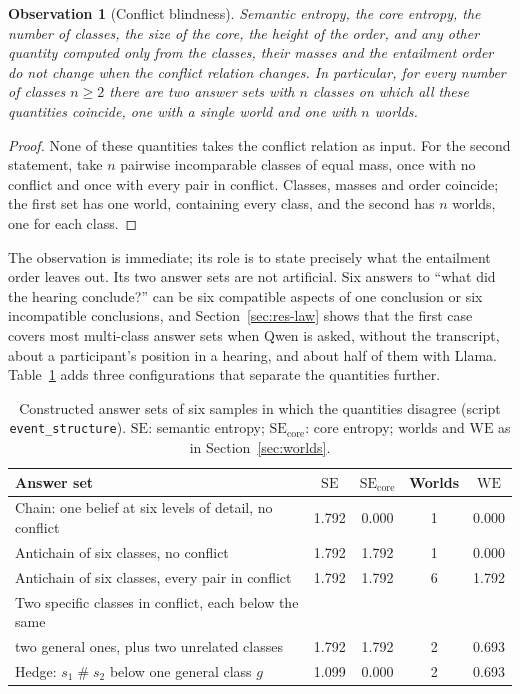 \documentclass[english]{desafiokunumi}
\newtheorem{observation}[proposition]{Observation}
\theoremstyle{definition}
\theoremstyle{remark}
\newcommand{\SE}{\mathrm{SE}}
\newcommand{\SEc}{\mathrm{SE}_{\mathrm{core}}}
\newcommand{\WE}{\mathrm{WE}}
\newcommand{\cf}{\mathrel{\#}}
\begin{document}
\begin{observation}[Conflict blindness]
\label{obs:cegueira}
Semantic entropy, the core entropy, the number of classes, the size of the
core, the height of the order, and any other quantity computed only from the
classes, their masses and the entailment order do not change when the conflict
relation changes. In particular, for every number of classes $n \ge 2$ there
are two answer sets with $n$ classes on which all these quantities coincide,
one with a single world and one with $n$ worlds.
\end{observation}

\begin{proof}
None of these quantities takes the conflict relation as input. For the second
statement, take $n$ pairwise incomparable classes of equal mass, once with no
conflict and once with every pair in conflict. Classes, masses and order
coincide; the first set has one world, containing every class, and the second
has $n$ worlds, one for each class.
\end{proof}

The observation is immediate; its role is to state precisely what the
entailment order leaves out. Its two answer sets are not artificial. Six
answers to ``what did the hearing conclude?'' can be six compatible aspects of
one conclusion or six incompatible conclusions, and Section~\ref{sec:res-law}
shows that the first case covers most multi-class answer sets when Qwen is
asked, without the transcript, about a participant's position in a hearing,
and about half of them with Llama.
Table~\ref{tab:separacao} adds three configurations that separate the
quantities further.

\begin{table}[ht]
  \centering
  \caption{Constructed answer sets of six samples in which the quantities
  disagree (script \texttt{event\_structure}). $\SE$: semantic entropy; $\SEc$: core entropy;
  worlds and $\WE$ as in Section~\ref{sec:worlds}.}
  \label{tab:separacao}
  \small
  \begin{tabular}{@{}lcccc@{}}
    \toprule
    \textbf{Answer set} & $\SE$ & $\SEc$ & \textbf{Worlds} & $\WE$ \\
    \midrule
    Chain: one belief at six levels of detail, no conflict & 1.792 & 0.000 & 1 & 0.000 \\
    Antichain of six classes, no conflict                   & 1.792 & 1.792 & 1 & 0.000 \\
    Antichain of six classes, every pair in conflict        & 1.792 & 1.792 & 6 & 1.792 \\
    Two specific classes in conflict, each below the same &&&& \\
    \quad two general ones, plus two unrelated classes      & 1.792 & 1.792 & 2 & 0.693 \\
    Hedge: $s_1 \cf s_2$ below one general class $g$        & 1.099 & 0.000 & 2 & 0.693 \\
    \bottomrule
  \end{tabular}
\end{table}
\end{document}
